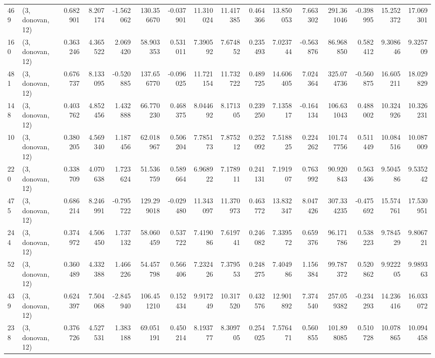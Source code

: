 \begin{tabular}{llrrrrrrrrrrrrrr}
469 &  (3, donovan, 12) &   0.682901 &   8.207174 &  -1.562062 &   130.356670 &  -0.037901 &  11.310024 &  11.417385 &  0.464366 &  13.850053 &   7.663302 &    291.361046 &   -0.398995 &   15.252372 &   17.069301 \\
160 &  (3, donovan, 12) &   0.363246 &   4.365522 &   2.069420 &    58.903353 &   0.531011 &   7.390592 &   7.674852 &  0.235493 &   7.023744 &  -0.563876 &     86.968850 &    0.582412 &    9.308646 &    9.325709 \\
481 &  (3, donovan, 12) &   0.676737 &   8.133095 &  -0.520885 &   137.656770 &  -0.096025 &  11.721154 &  11.732722 &  0.489725 &  14.606405 &   7.024364 &    325.074736 &   -0.560875 &   16.605211 &   18.029829 \\
148 &  (3, donovan, 12) &   0.403762 &   4.852456 &   1.432888 &    66.770230 &   0.468375 &   8.044692 &   8.171305 &  0.239250 &   7.135817 &  -0.164134 &    106.631043 &    0.488002 &   10.324926 &   10.326231 \\
10  &  (3, donovan, 12) &   0.380205 &   4.569340 &   1.187456 &    62.018967 &   0.506204 &   7.785173 &   7.875212 &  0.252092 &   7.518825 &   0.224262 &    101.747756 &    0.511449 &   10.084516 &   10.087009 \\
220 &  (3, donovan, 12) &   0.338709 &   4.070638 &   1.723624 &    51.536759 &   0.589664 &   6.968922 &   7.178911 &  0.241131 &   7.191907 &   0.763992 &     90.920843 &    0.563436 &    9.504586 &    9.535242 \\
475 &  (3, donovan, 12) &   0.686214 &   8.246991 &  -0.795722 &   129.299018 &  -0.029480 &  11.343097 &  11.370973 &  0.463772 &  13.832347 &   8.047426 &    307.334235 &   -0.475692 &   15.574761 &   17.530951 \\
244 &  (3, donovan, 12) &   0.374972 &   4.506450 &   1.737132 &    58.060459 &   0.537722 &   7.419086 &   7.619741 &  0.246082 &   7.339572 &   0.659376 &     96.171786 &    0.538223 &    9.784529 &    9.806721 \\
52  &  (3, donovan, 12) &   0.360489 &   4.332388 &   1.466226 &    54.457798 &   0.566406 &   7.232426 &   7.379553 &  0.248275 &   7.404986 &   1.156384 &     99.787372 &    0.520862 &    9.922205 &    9.989363 \\
439 &  (3, donovan, 12) &   0.624397 &   7.504068 &  -2.845940 &   106.451210 &   0.152434 &   9.917249 &  10.317520 &  0.432576 &  12.901892 &   7.374540 &    257.059382 &   -0.234293 &   14.236416 &   16.033072 \\
238 &  (3, donovan, 12) &   0.376726 &   4.527531 &   1.383188 &    69.051191 &   0.450214 &   8.193777 &   8.309705 &  0.254025 &   7.576471 &   0.560855 &    101.898085 &    0.510728 &   10.078865 &   10.094458 \\

\end{tabular}

